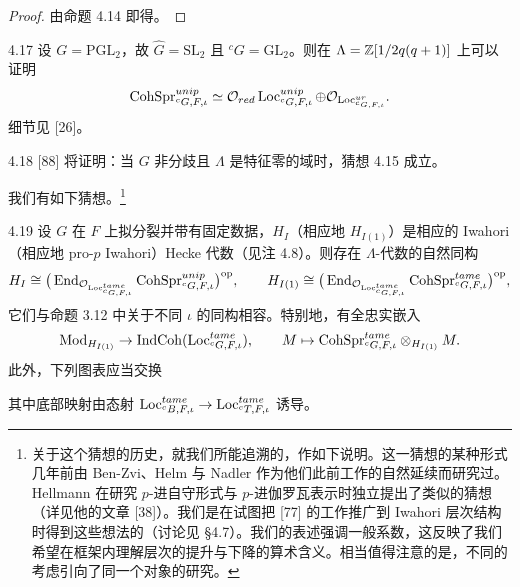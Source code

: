 \begin{proof}
由命题 4.14 即得。
\end{proof}

\begin{exam}{4.17}
设 $G=\mathrm{PGL}_2$，故 $\hat G=\mathrm{SL}_2$ 且 ${}^cG=\mathrm{GL}_2$。则在 $\Lambda=\mathbb{Z}[1/2q(q+1)]$ 上可以证明
\[
\mathrm{CohSpr}^{unip}_{{}^cG,F,\iota}\simeq\mathcal{O}_{red}\operatorname{Loc}^{unip}_{{}^cG,F,\iota}\oplus\mathcal{O}_{\operatorname{Loc}^{ur}_{{}^cG,F,\iota}}.
\]
细节见 [26]。
\end{exam}

\begin{rem}{4.18}
[88] 将证明：当 $G$ 非分歧且 $\Lambda$ 是特征零的域时，猜想 4.15 成立。
\end{rem}

我们有如下猜想。\footnote{关于这个猜想的历史，就我们所能追溯的，作如下说明。这一猜想的某种形式几年前由 Ben-Zvi、Helm 与 Nadler 作为他们此前工作的自然延续而研究过。Hellmann 在研究 $p$-进自守形式与 $p$-进伽罗瓦表示时独立提出了类似的猜想（详见他的文章 [38]）。我们是在试图把 [77] 的工作推广到 Iwahori 层次结构时得到这些想法的（讨论见 §4.7）。我们的表述强调一般系数，这反映了我们希望在框架内理解层次的提升与下降的算术含义。相当值得注意的是，不同的考虑引向了同一个对象的研究。}

\begin{conj}{4.19}
设 $G$ 在 $F$ 上拟分裂并带有固定数据，$H_I$（相应地 $H_{I(1)}$）是相应的 Iwahori（相应地 pro-$p$ Iwahori）Hecke 代数（见注 4.8）。则存在 $\Lambda$-代数的自然同构
\[
H_I\cong\big(\operatorname{End}_{\mathcal{O}_{\operatorname{Loc}^{tame}_{{}^cG,F,\iota}}}\mathrm{CohSpr}^{unip}_{{}^cG,F,\iota}\big)^{\mathrm{op}},\qquad
H_{I(1)}\cong\big(\operatorname{End}_{\mathcal{O}_{\operatorname{Loc}^{tame}_{{}^cG,F,\iota}}}\mathrm{CohSpr}^{tame}_{{}^cG,F,\iota}\big)^{\mathrm{op}},
\]
它们与命题 3.12 中关于不同 $\iota$ 的同构相容。特别地，有全忠实嵌入
\[
\operatorname{Mod}_{H_{I(1)}}\to\operatorname{IndCoh}(\operatorname{Loc}^{tame}_{{}^cG,F,\iota}),\qquad
M\mapsto\mathrm{CohSpr}^{tame}_{{}^cG,F,\iota}\otimes_{H_{I(1)}}M.
\]
此外，下列图表应当交换
\begin{center}

\medskip
{}
\end{center}
其中底部映射由态射 $\operatorname{Loc}^{tame}_{{}^cB,F,\iota}\to\operatorname{Loc}^{tame}_{{}^cT,F,\iota}$ 诱导。
\end{conj}

